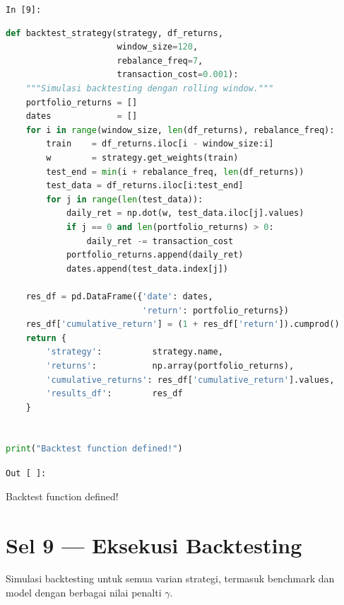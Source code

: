 \documentclass[12pt,a4paper]{article}
\newcommand{\cellIn}[1]{%
  \begin{tcolorbox}[cellheader]
    \texttt{In [#1]:}
  \end{tcolorbox}\vspace{-6pt}%
}
\newcommand{\cellOut}{%
  \vspace{-4pt}%
  \begin{tcolorbox}[cellheader, colback=outputbg, colframe=outputframe, fontupper=\sffamily\small\bfseries\color{outputframe!80!black}]
    \texttt{Out [ ]:}
  \end{tcolorbox}\vspace{-6pt}%
}
\begin{document}
\cellIn{9}
\begin{tcolorbox}[codebox]
\begin{lstlisting}[language=Python, numbers=none]
def backtest_strategy(strategy, df_returns,
                      window_size=120,
                      rebalance_freq=7,
                      transaction_cost=0.001):
    """Simulasi backtesting dengan rolling window."""
    portfolio_returns = []
    dates             = []
    for i in range(window_size, len(df_returns), rebalance_freq):
        train    = df_returns.iloc[i - window_size:i]
        w        = strategy.get_weights(train)
        test_end = min(i + rebalance_freq, len(df_returns))
        test_data = df_returns.iloc[i:test_end]
        for j in range(len(test_data)):
            daily_ret = np.dot(w, test_data.iloc[j].values)
            if j == 0 and len(portfolio_returns) > 0:
                daily_ret -= transaction_cost
            portfolio_returns.append(daily_ret)
            dates.append(test_data.index[j])

    res_df = pd.DataFrame({'date': dates,
                           'return': portfolio_returns})
    res_df['cumulative_return'] = (1 + res_df['return']).cumprod()
    return {
        'strategy':          strategy.name,
        'returns':           np.array(portfolio_returns),
        'cumulative_returns': res_df['cumulative_return'].values,
        'results_df':        res_df
    }


print("Backtest function defined!")
\end{lstlisting}
\end{tcolorbox}

\cellOut
\begin{tcolorbox}[outputbox]
Backtest function defined!
\end{tcolorbox}

\section{Sel 9 --- Eksekusi Backtesting}

Simulasi backtesting untuk semua varian strategi, termasuk benchmark dan model
dengan berbagai nilai penalti $\gamma$.
\end{document}
